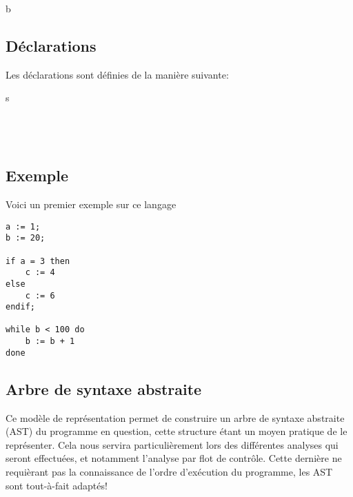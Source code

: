\documentclass[a4paper, 12pt]{article}
\begin{document}
\begin{dtype}{b}
  \\
\end{dtype}

\subsection{Déclarations}
Les déclarations sont définies de la manière suivante:

\begin{dtype}{s}
  \\
  \\
  \akind{\sskip}\\
  \\
\end{dtype}

\subsection{Exemple}
\noindent
Voici un premier exemple sur ce langage
\begin{lstlisting}[tabsize=2]
a := 1;
b := 20;

if a = 3 then
	c := 4
else
	c := 6
endif;

while b < 100 do
	b := b + 1
done
\end{lstlisting}

\subsection{Arbre de syntaxe abstraite}
Ce modèle de représentation permet de construire un arbre de syntaxe abstraite (AST) du programme en question,
cette structure étant un moyen pratique de le représenter. Cela nous servira particulièrement lors des différentes
analyses qui seront effectuées, et notamment l'analyse par flot de contrôle. Cette dernière ne requièrant pas
la connaissance de l'ordre d'exécution du programme, les AST sont tout-à-fait adaptés!

\begin{center}\end{center}
\end{document}
